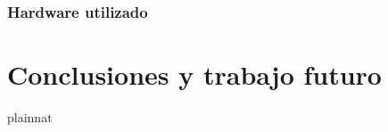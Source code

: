 \documentclass[a4paper,10pt]{report}
\begin{document}


\subsection{Hardware utilizado}

\chapter{Conclusiones y trabajo futuro}




 {plainnat}




  
\end{document}
